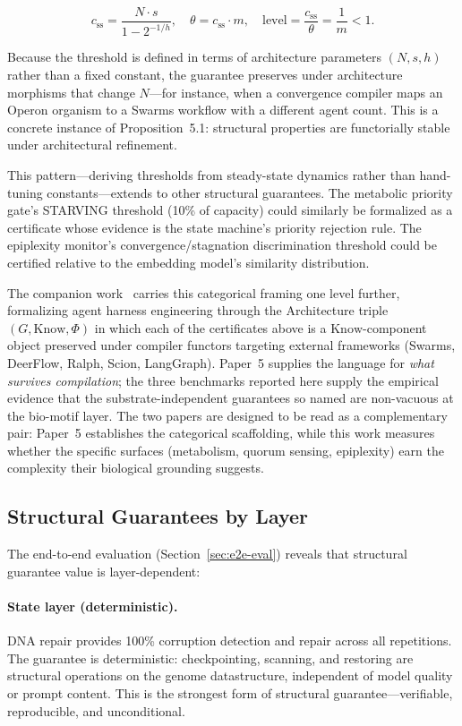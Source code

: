 \[
  c_\text{ss} = \frac{N \cdot s}{1 - 2^{-1/h}}, \quad
  \theta = c_\text{ss} \cdot m, \quad
  \text{level} = \frac{c_\text{ss}}{\theta} = \frac{1}{m} < 1.
\]

Because the threshold is defined in terms of architecture parameters
$(N, s, h)$ rather than a fixed constant, the guarantee preserves
under architecture morphisms that change $N$---for instance, when a
convergence compiler maps an Operon organism to a Swarms workflow
with a different agent count.  This is a concrete instance of
Proposition~5.1: structural properties are functorially stable under
architectural refinement.

This pattern---deriving thresholds from steady-state dynamics rather
than hand-tuning constants---extends to other structural guarantees.
The metabolic priority gate's STARVING threshold (10\% of capacity)
could similarly be formalized as a certificate whose evidence is the
state machine's priority rejection rule.  The epiplexity monitor's
convergence/stagnation discrimination threshold could be certified
relative to the embedding model's similarity distribution.

The companion work~\cite{banu2026harness} carries this categorical
framing one level further, formalizing agent harness engineering through
the Architecture triple $(G, \mathrm{Know}, \Phi)$ in which each of the
certificates above is a $\mathrm{Know}$-component object preserved under
compiler functors targeting external frameworks (Swarms, DeerFlow, Ralph,
Scion, LangGraph).  Paper~5 supplies the language for \emph{what
survives compilation}; the three benchmarks reported here supply the
empirical evidence that the substrate-independent guarantees so named
are non-vacuous at the bio-motif layer.  The two papers are designed to
be read as a complementary pair: Paper~5 establishes the categorical
scaffolding, while this work measures whether the specific surfaces
(metabolism, quorum sensing, epiplexity) earn the complexity their
biological grounding suggests.

\subsection{Structural Guarantees by Layer}

The end-to-end evaluation (Section~\ref{sec:e2e-eval}) reveals that
structural guarantee value is layer-dependent:

\paragraph{State layer (deterministic).}
DNA repair provides 100\% corruption detection and repair across all
repetitions.  The guarantee is deterministic: checkpointing, scanning,
and restoring are structural operations on the genome datastructure,
independent of model quality or prompt content.  This is the strongest
form of structural guarantee---verifiable, reproducible, and
unconditional.


